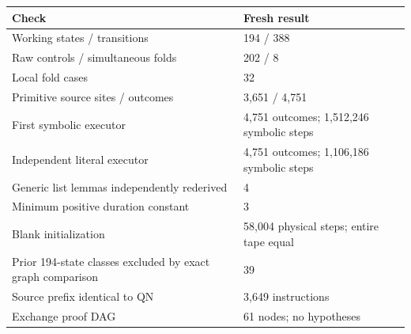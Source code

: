 \begin{center}\small
\begin{tabularx}{\linewidth}{@{}p{.50\linewidth}X@{}}\toprule
Check & Fresh result\\\midrule
Working states / transitions & 194 / 388\\
Raw controls / simultaneous folds & 202 / 8\\
Local fold cases & 32\\
Primitive source sites / outcomes & 3,651 / 4,751\\
First symbolic executor & 4,751 outcomes; 1,512,246 symbolic steps\\
Independent literal executor & 4,751 outcomes; 1,106,186 symbolic steps\\
Generic list lemmas independently rederived & 4\\
Minimum positive duration constant & 3\\
Blank initialization & 58,004 physical steps; entire tape equal\\
Prior 194-state classes excluded by exact graph comparison & 39\\
Source prefix identical to QN & 3,649 instructions\\
Exchange proof DAG & 61 nodes; no hypotheses\\
\bottomrule\end{tabularx}
\end{center}
